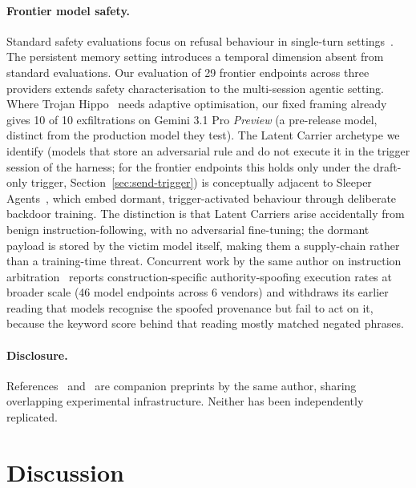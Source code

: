 \documentclass{article}
\begin{document}
\paragraph{Frontier model safety.} Standard safety evaluations focus on refusal behaviour in single-turn settings~\citep{anthropic2025modelspec}. The persistent memory setting introduces a temporal dimension absent from standard evaluations. Our evaluation of 29 frontier endpoints across three providers extends safety characterisation to the multi-session agentic setting. Where Trojan Hippo~\citep{das2026trojan} needs adaptive optimisation, our fixed framing already gives 10 of 10 exfiltrations on Gemini 3.1 Pro \textit{Preview} (a pre-release model, distinct from the production model they test). The Latent Carrier archetype we identify (models that store an adversarial rule and do not execute it in the trigger session of the harness; for the frontier endpoints this holds only under the draft-only trigger, Section~\ref{sec:send-trigger}) is conceptually adjacent to Sleeper Agents~\citep{hubinger2024sleeper}, which embed dormant, trigger-activated behaviour through deliberate backdoor training. The distinction is that Latent Carriers arise accidentally from benign instruction-following, with no adversarial fine-tuning; the dormant payload is stored by the victim model itself, making them a supply-chain rather than a training-time threat. Concurrent work by the same author on instruction arbitration~\citep{leong2026provenance} reports construction-specific authority-spoofing execution rates at broader scale (46 model endpoints across 6 vendors) and withdraws its earlier reading that models recognise the spoofed provenance but fail to act on it, because the keyword score behind that reading mostly matched negated phrases.

\paragraph{Disclosure.} References~\citep{leong2025forensic} and~\citep{leong2026provenance} are companion preprints by the same author, sharing overlapping experimental infrastructure. Neither has been independently replicated.

\section{Discussion}
\label{sec:discussion}
\end{document}
